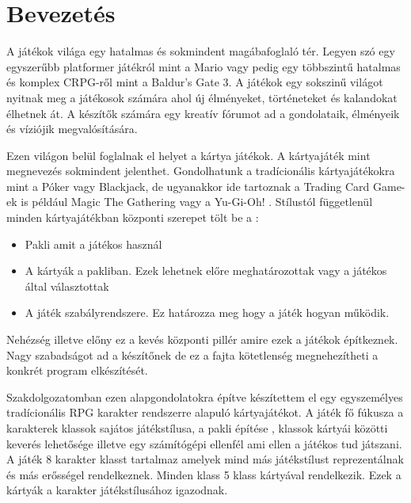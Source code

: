 \chapter{Bevezetés}


A játékok világa egy hatalmas és sokmindent magábafoglaló tér. Legyen szó egy egyszerűbb platformer játékról mint a Mario vagy pedig egy többszintű hatalmas és komplex CRPG-ről mint a Baldur's Gate 3. A játékok egy sokszinű világot nyitnak meg a játékosok számára ahol új élményeket, történeteket és kalandokat élhetnek át. A készítők számára egy kreatív fórumot ad a gondolataik, élményeik és víziójik megvalósítására.

Ezen világon belül foglalnak el helyet a kártya játékok. A kártyajáték mint megnevezés sokmindent jelenthet. Gondolhatunk a tradícionális kártyajátékokra mint a Póker vagy Blackjack, de ugyanakkor ide tartoznak a Trading Card Game-ek is például Magic The Gathering vagy a Yu-Gi-Oh! . Stílustól függetlenül minden kártyajátékban központi szerepet tölt be a :
\begin{itemize}
    \item Pakli amit a játékos használ 
    \item A kártyák a pakliban. Ezek lehetnek előre meghatározottak vagy a játékos által választottak
    \item A játék szabályrendszere. Ez határozza meg hogy a játék hogyan működik.
\end{itemize}

Nehézség illetve előny ez a kevés központi pillér amire ezek a játékok építkeznek. Nagy szabadságot ad a készítőnek de ez a fajta kötetlenség megnehezítheti a konkrét program elkészítését. 

Szakdolgozatomban ezen alapgondolatokra építve készítettem el egy egyszemélyes tradícionális RPG karakter rendszerre alapuló kártyajátékot. A játék fő fúkusza a karakterek klassok  sajátos játékstílusa, a pakli építése , klassok kártyái közötti keverés lehetősége illetve egy számítógépi ellenfél ami ellen a játékos tud játszani. A játék 8 karakter klasst tartalmaz amelyek mind más játékstílust reprezentálnak és más erősségel rendelkeznek. Minden klass 5 klass kártyával rendelkezik. Ezek a kártyák a karakter játékstílusához igazodnak. 

